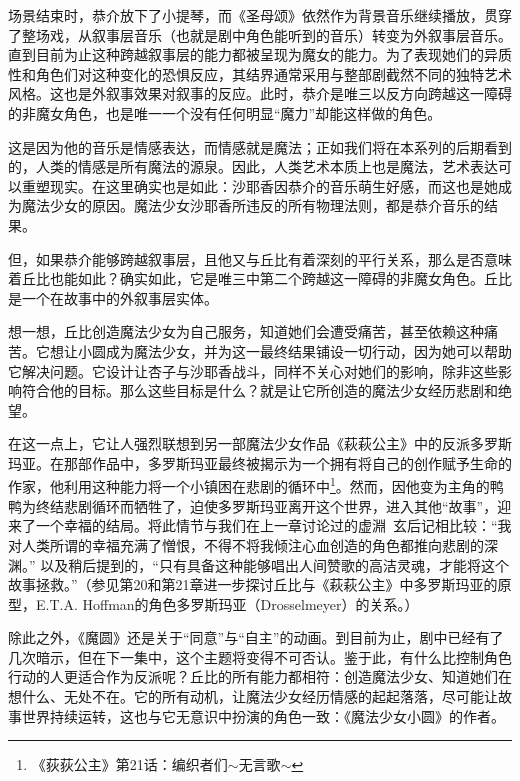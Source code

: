 场景结束时，恭介放下了小提琴，而《圣母颂》依然作为背景音乐继续播放，贯穿了整场戏，从叙事层音乐（也就是剧中角色能听到的音乐）转变为外叙事层音乐。直到目前为止这种跨越叙事层的能力都被呈现为魔女的能力。为了表现她们的异质性和角色们对这种变化的恐惧反应，其结界通常采用与整部剧截然不同的独特艺术风格。这也是外叙事效果对叙事的反应。此时，恭介是唯三以反方向跨越这一障碍的非魔女角色，也是唯一一个没有任何明显“魔力”却能这样做的角色。

这是因为他的音乐是情感表达，而情感就是魔法；正如我们将在本系列的后期看到的，人类的情感是所有魔法的源泉。因此，人类艺术本质上也是魔法，艺术表达可以重塑现实。在这里确实也是如此：沙耶香因恭介的音乐萌生好感，而这也是她成为魔法少女的原因。魔法少女沙耶香所违反的所有物理法则，都是恭介音乐的结果。

但，如果恭介能够跨越叙事层，且他又与丘比有着深刻的平行关系，那么是否意味着丘比也能如此？确实如此，它是唯三中第二个跨越这一障碍的非魔女角色。丘比是一个在故事中的外叙事层实体。

想一想，丘比创造魔法少女为自己服务，知道她们会遭受痛苦，甚至依赖这种痛苦。它想让小圆成为魔法少女，并为这一最终结果铺设一切行动，因为她可以帮助它解决问题。它设计让杏子与沙耶香战斗，同样不关心对她们的影响，除非这些影响符合他的目标。那么这些目标是什么？就是让它所创造的魔法少女经历悲剧和绝望。

在这一点上，它让人强烈联想到另一部魔法少女作品《萩萩公主》中的反派多罗斯玛亚\cite{ref33}。在那部作品中，多罗斯玛亚最终被揭示为一个拥有将自己的创作赋予生命的作家，他利用这种能力将一个小镇困在悲剧的循环中\footnote{《荻荻公主》第21话：编织者们$\sim$无言歌$\sim$}。然而，因他变为主角的鸭鸭为终结悲剧循环而牺牲了，迫使多罗斯玛亚离开这个世界，进入其他“故事”，迎来了一个幸福的结局。将此情节与我们在上一章讨论过的虚淵\, 玄后记相比较：“我对人类所谓的幸福充满了憎恨，不得不将我倾注心血创造的角色都推向悲剧的深渊。” 以及稍后提到的，“只有具备这种能够唱出人间赞歌的高洁灵魂，才能将这个故事拯救。”\cite{ref29}（参见第20和第21章进一步探讨丘比与《萩萩公主》中多罗斯玛亚的原型，E.T.A. Hoffman的角色多罗斯玛亚（Drosselmeyer）的关系。）

除此之外，《魔圆》还是关于“同意”与“自主”的动画。到目前为止，剧中已经有了几次暗示，但在下一集中，这个主题将变得不可否认。鉴于此，有什么比控制角色行动的人更适合作为反派呢？丘比的所有能力都相符：创造魔法少女、知道她们在想什么、无处不在。它的所有动机，让魔法少女经历情感的起起落落，尽可能让故事世界持续运转，这也与它无意识中扮演的角色一致：《魔法少女小圆》的作者。
